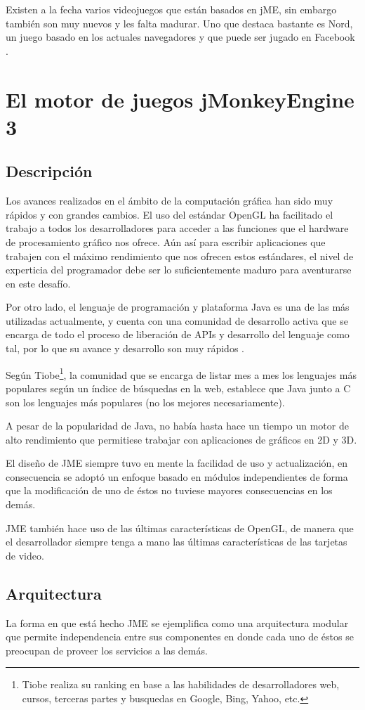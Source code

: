 \documentclass[a4paper,12pt,openany,oneside]{book}
\begin{document}
Existen a la fecha varios videojuegos que están basados en jME, sin embargo también son muy nuevos y les falta madurar. Uno que destaca bastante es Nord, un juego basado en los actuales navegadores y que puede ser jugado en Facebook \cite{JMONKEY}.
\chapter{El motor de juegos jMonkeyEngine 3}
\section{Descripción}
Los avances realizados en el ámbito de la computación gráfica han sido muy rápidos y con grandes cambios. El uso del estándar OpenGL ha facilitado el trabajo a todos los desarrolladores para acceder a las funciones que el hardware de procesamiento gráfico nos ofrece. Aún así para escribir aplicaciones que trabajen con el máximo rendimiento que nos ofrecen estos estándares, el nivel de experticia del programador debe ser lo suficientemente maduro para aventurarse en este desafío.

Por otro lado, el lenguaje de programación y plataforma Java es una de las más utilizadas actualmente, y cuenta con una comunidad de desarrollo activa que se encarga de todo el proceso de liberación de APIs y desarrollo del lenguaje como tal, por lo que su avance y desarrollo son muy rápidos \cite{JAVA}.

Según Tiobe\footnote{Tiobe realiza su ranking en base a las habilidades de desarrolladores web, cursos, terceras partes y busquedas en Google, Bing, Yahoo, etc.}, la comunidad que se encarga de listar mes a mes los lenguajes más populares según un índice de búsquedas en la web, establece que Java junto a C son los lenguajes más populares (no los mejores necesariamente).

A pesar de la popularidad de Java, no había hasta hace un tiempo un motor de alto rendimiento que permitiese trabajar con aplicaciones de gráficos en 2D y 3D.

El diseño de JME siempre tuvo en mente la facilidad de uso y actualización, en consecuencia se adoptó un enfoque basado en módulos independientes de forma que la modificación de uno de éstos no tuviese mayores consecuencias en los demás. 

JME también hace uso de las últimas características de OpenGL, de manera que el desarrollador siempre tenga a mano las últimas características de las tarjetas de video.
\section{Arquitectura}
La forma en que está hecho JME se ejemplifica como una arquitectura modular que permite independencia entre sus componentes en donde cada uno de éstos se preocupan de proveer los servicios a las demás. 
\end{document}
